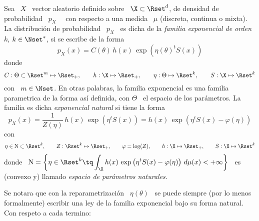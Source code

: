 \begin{definicion}\label{Def:MP:FamiliaExponencial}
%
  Sea  \ $X$  \  vector aleatorio  definido  sobre \  $\X  \subset \Rset^d$,  de
  densidad  de probabilidad  \  $p_X$ \  \ con  respecto  a una  medida \  $\mu$
  (discreta, continua o  mixta). La distribuci\'on de probabilidad  \ $p_X$ \ es
  dicha de  la {\em familia  exponencial de orden  $k$}, $k \in \Nset^*$,  si se
  escribe de la forma
  \[
  p_X(x) = C(\theta) \, h(x) \, \exp\left( \eta(\theta)^t S(x) \right)
  \]
  donde
  \[
  C:  \Theta \subset  \Rset^m \mapsto  \Rset_+,  \qquad h:  \X \mapsto  \Rset_+,
  \qquad \eta: \Theta \mapsto \Rset^k, \qquad S: \X \mapsto \Rset^k
  \]
  con \ $m \in \Nset$.  En otras palabras, la familia exponencial es una familia
  parametrica  de la  forma as\'i  definida, con  $\Theta$ \  el espacio  de los
  par\'ametros. La familia es dicha {\em exponencial natural} si tiene la forma
  \[
  p_X(x) = \frac{1}{Z(\eta)}  \, h(x) \, \exp\left( \eta^t  S(x) \right) = h(x)
  \, \exp\left( \eta^t S(x) - \varphi(\eta) \right)
  \]
  con
  \[
  \eta \in \mathrm{N} \subset \Rset^k, \qquad Z: \Rset^k \mapsto \Rset_+, \qquad
  \varphi = \log(Z), \qquad h: \X \mapsto \Rset_+, \qquad S: \X \mapsto \Rset^k
  \]
  donde  \ $\displaystyle  \mathrm{N} =  \left\{  \eta \in  \Rset^k \tq  \int_\X h(x)  \,
    \exp\left(  \eta^t  S(x) -  \varphi(\eta)  \right)  \,  d\mu(x) <  +  \infty
  \right\}$ \ es (convexo y) llamado {\em espacio de par\'ametros naturales}.
\end{definicion}
%
Se notara  que con  la reparametrizaci\'on \  $\eta(\theta)$ \ se  puede siempre
(por lo  menos formalmente) escribir una  ley de la familia  exponencial bajo su
forma natural. Con respeto a cada termino:
%
